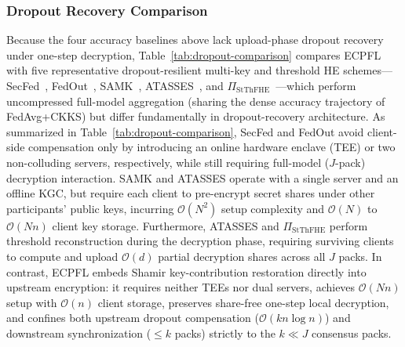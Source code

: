 \subsubsection{Dropout Recovery Comparison}
Because the four accuracy baselines above lack upload-phase dropout recovery under one-step decryption, Table~\ref{tab:dropout-comparison} compares \textsc{ECPFL} with five representative dropout-resilient multi-key and threshold HE schemes---SecFed~\cite{cai2023secfed}, FedOut~\cite{yuan2026fedout}, SAMK~\cite{li2025samk}, ATASSES~\cite{chang2025atasses}, and $\Pi_{\mathrm{StThFHE}}$~\cite{kim2026tfhead}---which perform uncompressed full-model aggregation (sharing the dense accuracy trajectory of FedAvg+CKKS) but differ fundamentally in dropout-recovery architecture. As summarized in Table~\ref{tab:dropout-comparison}, SecFed and FedOut avoid client-side compensation only by introducing an online hardware enclave (TEE) or two non-colluding servers, respectively, while still requiring full-model ($J$-pack) decryption interaction. SAMK and ATASSES operate with a single server and an offline KGC, but require each client to pre-encrypt secret shares under other participants' public keys, incurring $\mathcal{O}(N^2)$ setup complexity and $\mathcal{O}(N)$ to $\mathcal{O}(Nn)$ client key storage. Furthermore, ATASSES and $\Pi_{\mathrm{StThFHE}}$ perform threshold reconstruction during the decryption phase, requiring surviving clients to compute and upload $\mathcal{O}(d)$ partial decryption shares across all $J$ packs. In contrast, \textsc{ECPFL} embeds Shamir key-contribution restoration directly into upstream encryption: it requires neither TEEs nor dual servers, achieves $\mathcal{O}(Nn)$ setup with $\mathcal{O}(n)$ client storage, preserves share-free one-step local decryption, and confines both upstream dropout compensation ($\mathcal{O}(kn\log n)$) and downstream synchronization ($\le k$ packs) strictly to the $k \ll J$ consensus packs.


